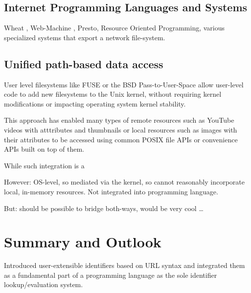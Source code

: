 \documentclass[preprint,authoryear]{acm_proc_article-sp}
\begin{document}
\subsection{Internet Programming Languages and Systems}

Wheat \cite{wheat}, Web-Machine \cite{webmachine}, Presto, Resource Oriented Programming,
various specialized systems that export a network file-system.

\subsection{Unified path-based data access}

User level filesystems like FUSE   \cite{fuse} or the BSD Pass-to-User-Space\cite{puffs} allow
user-level code to add new filesystems to the Unix kernel, without requiring
kernel modifications or impacting operating system kernel stability.

This approach has enabled many types of remote resources such as 
YouTube videos with atttributes and thumbnails or local resources
such as images with their attributes to be accessed using common
POSIX file APIs or convenience APIs built on top of them.

While such integration is a

However:  OS-level, so mediated via the kernel, so cannot reasonably incorporate
local, in-memory resources.   Not integrated into programming language.

But:  should be possible to bridge both-ways, would be very cool \ldots


\section{Summary and Outlook}

Introduced user-extensible identifiers based on URL syntax and 
integrated them as a fundamental part of a programming language
as the sole identifier lookup/evaluation system.












\balancecolumns
\end{document}
